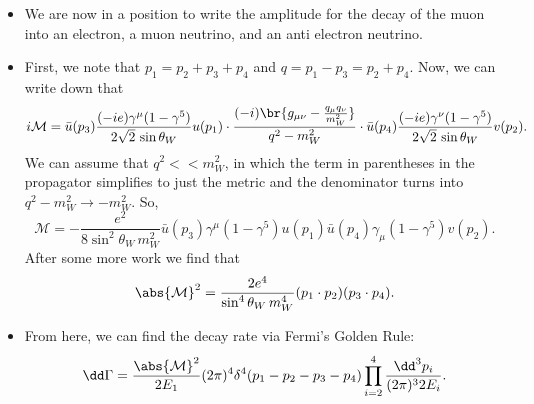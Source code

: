 \begin{itemize}
\item We are now in a position to write the amplitude for the decay of the muon into an electron, a muon neutrino, and an anti electron neutrino.
  \begin{center}
  \end{center}

\item First, we note that $p_1 = p_2+p_3+p_4$ and $q = p_1-p_3 = p_2+p_4$. Now, we can write down that
  \begin{equation}
    i\mathcal{M} = \bar{u}(p_3) \frac{(-ie)\gamma^\mu(1-\gamma^5)}{2\sqrt{2} \, \sin\theta_W} u(p_1) \cdot \frac{(-i)\br{g_{\mu\nu} - \frac{q_\mu q_\nu}{m_W^2}}}{q^2 - m_W^2} \cdot \bar{u}(p_4) \frac{(-ie)\gamma^\nu(1-\gamma^5)}{2\sqrt{2} \, \sin\theta_W} v(p_2).
  \end{equation}
  We can assume that $q^2 << m_W^2$, in which the term in parentheses in the propagator simplifies to just the metric and the denominator turns into $q^2 - m_W^2 \rightarrow -m_W^2$. So,
  \begin{equation}
    \mathcal{M} = - \frac{e^2}{8\sin^2\theta_W \, m_W^2} \bar{u}(p_3)\gamma^\mu(1-\gamma^5)u(p_1) \bar{u}(p_4) \gamma_\mu(1-\gamma^5)v(p_2).
  \end{equation}
  After some more work we find that
  \begin{equation}
    \abs{\mathcal{M}}^2 = \frac{2e^4}{\sin^4\theta_W \, m_W^4} (p_1 \cdot p_2)(p_3 \cdot p_4).
  \end{equation}
\item From here, we can find the decay rate via Fermi's Golden Rule:
  \begin{equation}
    \dd\Gamma = \frac{\abs{\mathcal{M}}^2}{2E_1} (2\pi)^4 \delta^4(p_1 - p_2 - p_3 - p_4) \prod_{i=2}^4 \frac{\dd^3p_i}{(2\pi)^3 2E_i}.
  \end{equation}
\end{itemize}





